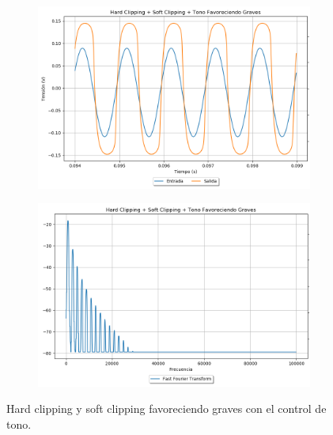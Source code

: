 \begin{figure}[H]
\hspace{-7.5em}
	\begin{subfigure}{0.5\textwidth}
		\includegraphics[width=1.5\textwidth, trim={0 0 0 0}, clip]{Ejercicio5/Imagenes/Propuesto/Mediciones/hard_soft_tone1.png}
		\label{fig:prop_alone3}
	\end{subfigure}
	\hspace{6em}
	\begin{subfigure}{0.5\textwidth}
		\includegraphics[width=1.5\textwidth, trim={0 0 0 0}, clip]{Ejercicio5/Imagenes/Propuesto/Mediciones/hard_soft_tonefft1.png}
		\centering
		\label{fig:prop_alone3fft}
	\end{subfigure}
	\caption{Hard clipping y soft clipping favoreciendo graves con el control de tono.}
\end{figure}

